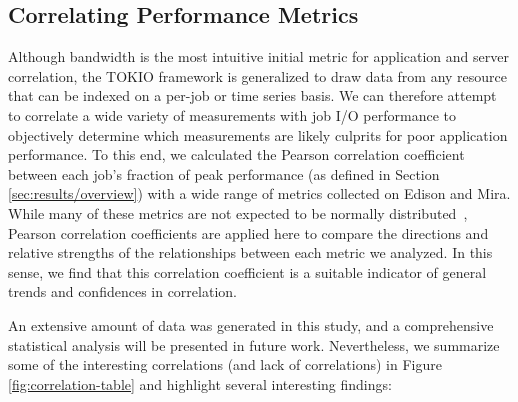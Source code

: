 \subsection{Correlating Performance Metrics} \label{sec:results/correlating}

Although bandwidth is the most intuitive initial metric for application and server
correlation,  
the TOKIO framework is generalized to draw data from any resource that can be indexed on a per-job or time series basis.
We can therefore attempt to correlate a wide variety of measurements with job
I/O performance to objectively determine which measurements are likely
culprits for poor application performance.
%
To this end, we calculated the Pearson correlation coefficient between each job's fraction of peak performance (as defined in Section \ref{sec:results/overview}) with a wide range of metrics collected on Edison and Mira.
While many of these metrics are not expected to be normally distributed~\cite{Kim2010}, Pearson correlation coefficients are applied here to compare the directions and relative strengths of the relationships between each metric we analyzed.
In this sense, we find that this correlation coefficient is a suitable indicator of general trends and confidences in correlation.

An extensive amount of data was generated in this study, and a comprehensive statistical analysis will be presented in future work.
Nevertheless, we summarize some of the interesting correlations (and lack of correlations) in Figure \ref{fig:correlation-table} and highlight several interesting findings:

